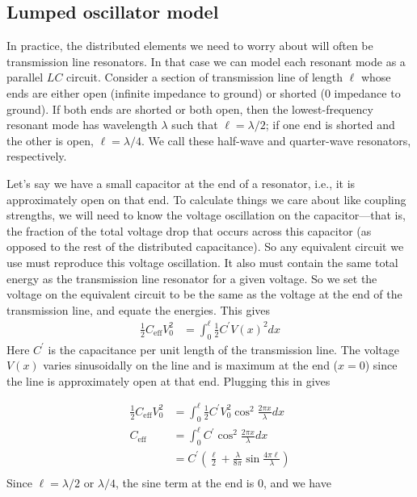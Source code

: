 \subsection{Lumped oscillator model}
\label{sec:LOM}
In practice, the distributed elements we need to worry about will often be transmission line resonators. In that case we can model each resonant mode as a parallel $LC$ circuit. Consider a section of transmission line of length $\ell$ whose ends are either open (infinite impedance to ground) or shorted (0 impedance to ground). If both ends are shorted or both open, then the lowest-frequency resonant mode has wavelength $\lambda$ such that $\ell = \lambda/2$; if one end is shorted and the other is open, $\ell = \lambda/4$. We call these half-wave and quarter-wave resonators, respectively. 

Let's say we have a small capacitor at the end of a resonator, i.e., it is approximately open on that end. To calculate things we care about like coupling strengths, we will need to know the voltage oscillation on the capacitor---that is, the fraction of the total voltage drop that occurs across this capacitor (as opposed to the rest of the distributed capacitance). So any equivalent circuit we use must reproduce this voltage oscillation. It also must contain the same total energy as the transmission line resonator for a given voltage. So we set the voltage on the equivalent circuit to be the same as the voltage at the end of the transmission line, and equate the energies. This gives
\begin{align*}
	\frac{1}{2}C_\mathrm{eff} V_0^2 &= \int_0^\ell \frac{1}{2} C^\prime V(x)^2dx
\end{align*}
Here $C^\prime$ is the capacitance per unit length of the transmission line. The voltage $V(x)$ varies sinusoidally on the line and is maximum at the end ($x=0$) since the line is approximately open at that end. Plugging this in gives

\begin{align*}
	\frac{1}{2}C_\mathrm{eff} V_0^2 &= \int_0^\ell \frac{1}{2} C^\prime V_0^2 \cos^2 \frac{2\pi x}{\lambda}dx \\
	C_\mathrm{eff} &= \int_0^\ell C^\prime \cos^2 \frac{2\pi x}{\lambda}dx \\
	&= C^\prime \left( \frac{\ell}{2} + \frac{\lambda}{8\pi}\sin\frac{4\pi \ell}{\lambda}\right) \\
\end{align*}
Since $\ell = \lambda/2$ or $\lambda/4$, the sine term at the end is 0, and we have


